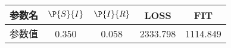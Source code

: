 \begin{tabular}{ccccc}
\hline
参数名&$\P{S}{I}$&$\P{I}{R}$&LOSS&FIT\\
\hline
参数值&0.350&0.058&2333.798&1114.849\\
\hline
\end{tabular}